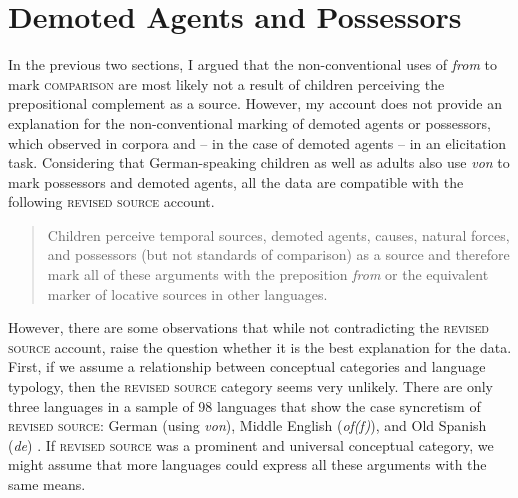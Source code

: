 \documentclass[lucida]{sp} %
\begin{document}












\section{Demoted Agents and Possessors}
\label{sec:agents-possessors}

In the previous two sections, I argued that the non-conventional uses of \textit{from} to mark \textsc{comparison} are most likely not a result of children perceiving the prepositional complement as a {source}. However, my account does not provide an explanation for the non-conventional marking of demoted agents or possessors, which \cite{clark1989a,clark1989b} observed in corpora and -- in the case of demoted agents --  in an elicitation task. Considering that German-speaking children as well as adults also use \textit{von} to mark possessors and demoted agents, all the data are compatible with the following \textsc{revised source} account.

\begin{quote}
Children perceive temporal sources, demoted agents, causes, natural forces, and possessors (but not standards of comparison) as a source and therefore mark all of these arguments with the preposition \textit{from} or the equivalent marker of locative sources in other languages.
\end{quote}

However, there are some observations that while not contradicting the \textsc{revised source} account, raise the question whether it is the best explanation for the data. First, if we assume a relationship between conceptual categories and language typology, then the \textsc{revised source} category seems very unlikely. There are only three languages in a sample of 98 languages that show the case syncretism of \textsc{revised source}: German (using \textit{von}), Middle English (\textit{of(f)}), and Old Spanish (\textit{de}) \citep{palancar2002}. If \textsc{revised source} was a prominent and universal conceptual category, we might assume that more languages could express all these arguments with the same means.
\end{document}
